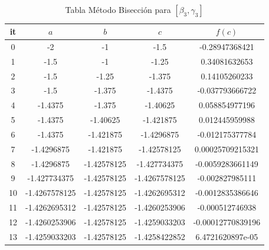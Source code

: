 \documentclass{article} %
\begin{document}
\begin{table}[H]
\centering
\begin{tabular}{|c|c|c|c|c|}
\hline
it & $a$ & $b$ & $c$ & $f(c)$\\
\hline
0 & -2 & -1 & -1.5 & -0.28947368421\\
1 & -1.5 & -1 & -1.25 & 0.34081632653\\
2 & -1.5 & -1.25 & -1.375 & 0.14105260233\\
3 & -1.5 & -1.375 & -1.4375 & -0.037793666722\\
4 & -1.4375 & -1.375 & -1.40625 & 0.058854977196\\
5 & -1.4375 & -1.40625 & -1.421875 & 0.012445959988\\
6 & -1.4375 & -1.421875 & -1.4296875 & -0.012175377784\\
7 & -1.4296875 & -1.421875 & -1.42578125 & 0.00025709215321\\
8 & -1.4296875 & -1.42578125 & -1.427734375 & -0.0059283661149\\
9 & -1.427734375 & -1.42578125 & -1.4267578125 & -0.002827985111\\
10 & -1.4267578125 & -1.42578125 & -1.4262695312 & -0.0012835386646\\
11 & -1.4262695312 & -1.42578125 & -1.4260253906 & -0.000512746938\\
12 & -1.4260253906 & -1.42578125 & -1.4259033203 & -0.00012770839196\\
13 & -1.4259033203 & -1.42578125 & -1.4258422852 & 6.4721620897e-05\\
\hline
\end{tabular}
\caption{Tabla Método Bisección para $[\beta_3 ,\gamma_3]$}
\end{table}
\end{document}
